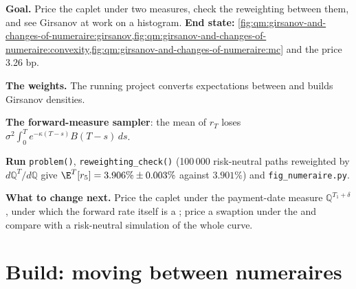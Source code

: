 \begin{tutorial}
\textbf{Goal.} Price the caplet under two measures, check the reweighting between them, and see
Girsanov at work on a histogram. \textbf{End state:}
\cref{fig:qm:girsanov-and-changes-of-numeraire:girsanov,fig:qm:girsanov-and-changes-of-numeraire:convexity,fig:qm:girsanov-and-changes-of-numeraire:mc}
and the price 3.26 bp.
\begin{tutsteps}
\item \textbf{The weights.} The running project converts expectations between  and builds
Girsanov densities.
\label{lst:qm:girsanov-and-changes-of-numeraire:weights}
\item \textbf{The forward-measure sampler}: the mean of $r_{T}$ loses $\sigma^2\int_0^Te^{-\kappa(T-s)}B(T - s)\,ds$.
\label{lst:qm:girsanov-and-changes-of-numeraire:forward}
\item \textbf{Run} \texttt{problem()}, \texttt{reweighting\_check()} (100\,000 risk-neutral paths
reweighted by $d\mathbb Q^{T}/d\mathbb Q$ give $\E^{T}[r_5] = 3.906\% \pm 0.003\%$ against $3.901\%$) and
\texttt{fig\_numeraire.py}.
\end{tutsteps}
\textbf{What to change next.} Price the caplet under the payment-date measure $\mathbb Q^{T_1 + \delta}$, under
which the forward rate itself is a ; price a swaption under the  and
compare with a risk-neutral simulation of the whole curve.
\end{tutorial}

\section{Build: moving between numeraires}\label{bld:qm:girsanov-and-changes-of-numeraire:numeraire}

